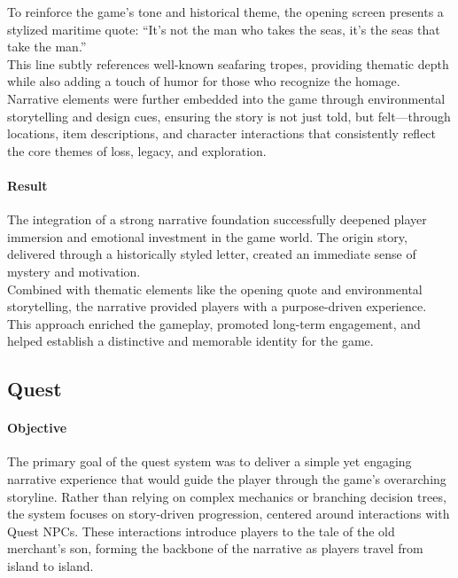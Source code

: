 \documentclass{article}
\begin{document}
To reinforce the game's tone and historical theme, the opening screen presents a stylized maritime quote: “It's not the man who takes the seas, it's the seas that take the man.”\\

This line subtly references well-known seafaring tropes, providing thematic depth while also adding a touch of humor for those who recognize the homage.\\

Narrative elements were further embedded into the game through environmental storytelling and design cues, ensuring the story is not just told, but felt—through locations, item descriptions, and character interactions that consistently reflect the core themes of loss, legacy, and exploration.

\paragraph{Result}\hfill

The integration of a strong narrative foundation successfully deepened player immersion and emotional investment in the game world. The origin story, delivered through a historically styled letter, created an immediate sense of mystery and motivation.\\

Combined with thematic elements like the opening quote and environmental storytelling, the narrative provided players with a purpose-driven experience. This approach enriched the gameplay, promoted long-term engagement, and helped establish a distinctive and memorable identity for the game.









\newpage
\subsection{Quest}
\paragraph{Objective}\hfill

The primary goal of the quest system was to deliver a simple yet engaging narrative experience that would guide the player through the game's overarching storyline. Rather than relying on complex mechanics or branching decision trees, the system focuses on story-driven progression, centered around interactions with Quest NPCs. These interactions introduce players to the tale of the old merchant's son, forming the backbone of the narrative as players travel from island to island.
\end{document}
